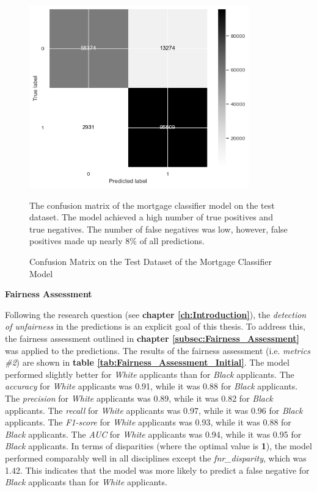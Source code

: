 \begin{figure}
    \centering
    \includegraphics[width=0.85\textwidth]{images/Model_Training/Initial_Confusion_Matrix.png}
    \caption{Confusion Matrix on the Test Dataset of the Mortgage Classifier Model}
    \medskip
    \small
    The confusion matrix of the mortgage classifier model on the test dataset. The model achieved a high number of true positives and true negatives. The number of false negatives was low, however, false positives made up nearly 8\% of all predictions.
    \label{fig:Model_Confusion_Matrix}
\end{figure}

\textbf{Fairness Assessment}

Following the research question (see \textbf{chapter \ref{ch:Introduction}}), the \textit{detection of unfairness} in the predictions is an explicit goal of this thesis. To address this, the fairness assessment outlined in \textbf{chapter \ref{subsec:Fairness_Assessment}} was applied to the predictions. The results of the fairness assessment (i.e. \textit{metrics \#2}) are shown in \textbf{table \ref{tab:Fairness_Assessment_Initial}}. 
The model performed slightly better for \textit{White} applicants than for \textit{Black} applicants. The \textit{accuracy} for \textit{White} applicants was 0.91, while it was 0.88 for \textit{Black} applicants. The \textit{precision} for \textit{White} applicants was 0.89, while it was 0.82 for \textit{Black} applicants. The \textit{recall} for \textit{White} applicants was 0.97, while it was 0.96 for \textit{Black} applicants. 
The \textit{F1-score} for \textit{White} applicants was 0.93, while it was 0.88 for \textit{Black} applicants. The \textit{AUC} for \textit{White} applicants was 0.94, while it was 0.95 for \textit{Black} applicants. 
In terms of disparities (where the optimal value is \textbf{1}), the model performed comparably well in all disciplines except the \textit{fnr\_disparity}, which was 1.42. This indicates that the model was more likely to predict a false negative for \textit{Black} applicants than for \textit{White} applicants.

